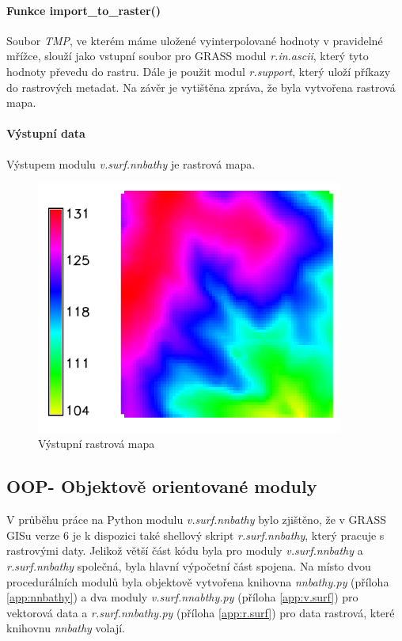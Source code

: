 \documentclass[12pt,a4paper]{article}
\begin{document}
\newpage
\paragraph{Funkce import\_to\_raster()}

Soubor \emph{TMP}, ve kterém máme uložené vyinterpolované hodnoty v
pravidelné mřížce, slouží jako vstupní soubor pro GRASS modul
\emph{r.in.ascii}, který tyto hodnoty převedu do rastru. Dále je
použit modul \emph{r.support}, který uloží příkazy do rastrových
metadat. Na závěr je vytištěna zpráva, že byla vytvořena rastrová
mapa.

\paragraph{Výstupní data}
Výstupem modulu \emph{v.surf.nnbathy} je rastrová mapa.

\begin{figure}[h!]
\centering
\includegraphics[width=0.9\textwidth]{img/vystup_rast_map.png}
\caption{Výstupní rastrová mapa}
\label{fig:vystup_rast_map}
\end{figure}

\newpage
\subsection{OOP- Objektově orientované moduly}

V průběhu práce na Python modulu \emph{v.surf.nnbathy} bylo
zjištěno, že v GRASS GISu verze 6 je k dispozici také shellový skript
\emph{r.surf.nnbathy}, který pracuje s rastrovými daty. Jelikož větší
část kódu byla pro moduly \emph{v.surf.nnbathy} a \emph{r.surf.nnbathy} společná,
byla hlavní výpočetní část spojena. Na místo dvou procedurálních
modulů byla objektově vytvořena knihovna \emph{nnbathy.py} (příloha \ref{app:nnbathy}) a dva
moduly \emph{v.surf.nnabthy.py} (příloha \ref{app:v.surf}) pro vektorová data a
\emph{r.surf.nnbathy.py} (příloha \ref{app:r.surf}) pro data rastrová, které knihovnu
\emph{nnbathy} volají.
\end{document}

